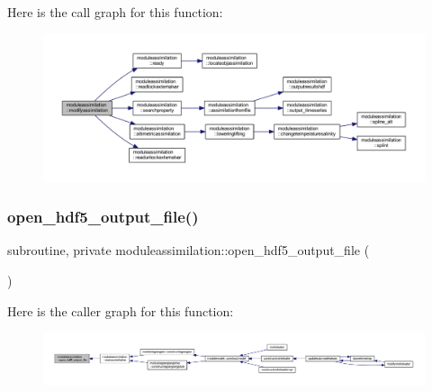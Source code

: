 Here is the call graph for this function\+:\nopagebreak
\begin{figure}[H]
\begin{center}
\leavevmode
\includegraphics[width=350pt]{namespacemoduleassimilation_a5932eaba41c6bd73ade2cb009b3824e8_cgraph}
\end{center}
\end{figure}
\mbox{\label{namespacemoduleassimilation_aaef927508148ef953ad8a480d4843ece}} 
\subsubsection{\texorpdfstring{open\+\_\+hdf5\+\_\+output\+\_\+file()}{open\_hdf5\_output\_file()}}
{\footnotesize\ttfamily subroutine, private moduleassimilation\+::open\+\_\+hdf5\+\_\+output\+\_\+file (\begin{DoxyParamCaption}{ }\end{DoxyParamCaption})\hspace{0.3cm}{\ttfamily [private]}}

Here is the caller graph for this function\+:\nopagebreak
\begin{figure}[H]
\begin{center}
\leavevmode
\includegraphics[width=350pt]{namespacemoduleassimilation_aaef927508148ef953ad8a480d4843ece_icgraph}
\end{center}
\end{figure}
\mbox{\label{namespacemoduleassimilation_a4802b71b408a488941f1becab34042ec}} 
